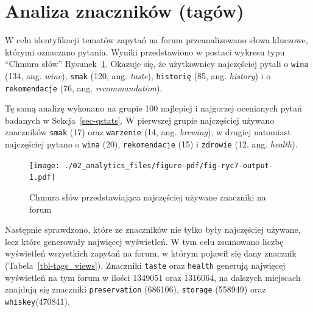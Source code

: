 \documentclass[
  letterpaper,
  DIV=11,
  numbers=noendperiod]{scrreprt}
\begin{document}
\hypertarget{analiza-znacznikuxf3w-taguxf3w}{%
\section{Analiza znaczników
(tagów)}\label{analiza-znacznikuxf3w-taguxf3w}}

W celu identyfikacji tematów zapytań na forum przeanalizowano słowa
kluczowe, którymi oznaczano pytania. Wyniki przedstawiono w postaci
wykresu typu ``Chmura słów'' Rysunek~\ref{fig-ryc7}. Okazuje się, że
użytkownicy najczęściej pytali o \texttt{wina} (134, ang. \emph{wine}),
\texttt{smak} (120, ang. \emph{taste}), \texttt{historię} (85, ang.
\emph{history}) i o \texttt{rekomendacje} (76, ang.
\emph{recommandation}).

Tę samą analizę wykonano na grupie 100 najlepiej i najgorzej ocenianych
pytań badanych w Sekcja~\ref{sec-qstats}. W pierwszej grupie najczęściej
używano znaczników \texttt{smak} (17) oraz \texttt{warzenie} (14, ang.
\emph{brewing}), w drugiej natomiast najczęściej pytano o \texttt{wina}
(20), \texttt{rekomendacje} (15) i \texttt{zdrowie} (12, ang.
\emph{health}).

\begin{figure}

{\centering \texttt{[image: ./02\_analytics\_files/figure-pdf/fig-ryc7-output-1.pdf]}

}

\caption{\label{fig-ryc7}Chmura słów przedstawiająca najczęściej używane
znaczniki na forum}

\end{figure}

Następnie sprawdzono, które ze znaczników nie tylko były najczęściej
używane, lecz które generowały najwięcej wyświetleń. W tym celu
zsumowano liczbę wyświetleń wszystkich zapytań na forum, w którym
pojawił się dany znacznik (Tabela~\ref{tbl-tags_views}). Znaczniki
\texttt{taste} oraz \texttt{health} generują najwięcej wyświetleń na tym
forum w ilości 1349051 oraz 1316064, na dalszych miejscach znajdują się
znaczniki \texttt{preservation} (686106), \texttt{storage} (558949) oraz
\texttt{whiskey}(470841).
\end{document}
